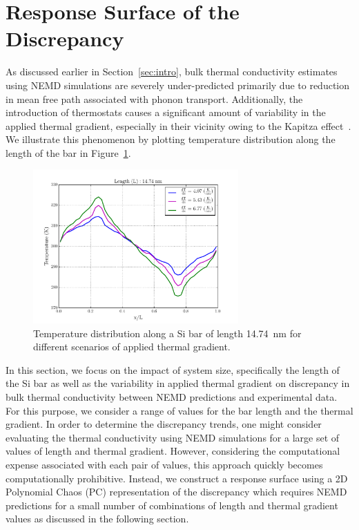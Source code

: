 \section{Response Surface of the Discrepancy}
\label{sec:response}

As discussed earlier in Section~\ref{sec:intro}, bulk thermal conductivity estimates using NEMD simulations
are severely under-predicted primarily due to reduction in mean free path associated with phonon transport. 
Additionally, the introduction of thermostats causes a significant amount of variability in the applied thermal gradient,
especially in their vicinity owing to the Kapitza effect~\cite{Stevens:2007}. 
We illustrate this phenomenon by plotting temperature 
distribution along the length of the bar in Figure~\ref{fig:kapitza}. 

\begin{figure}[htbp]
 \begin{center}
  \includegraphics[width=0.70\textwidth]{./Figures/temp_plot}
\caption{Temperature distribution along a Si bar of length 14.74~nm for
different scenarios of applied thermal gradient.}
\label{fig:kapitza}
\end{center}
\end{figure}

In this section, we focus on the impact of
system size, specifically the length of the Si bar as well as the variability in applied thermal gradient on discrepancy
in bulk thermal conductivity between NEMD predictions and experimental data. For this purpose, we consider
a range of values for the bar length and the thermal gradient. In order to determine the discrepancy trends, one
might consider evaluating the thermal conductivity using NEMD simulations for a large set of values of length and
thermal gradient. However, considering the computational expense associated with each pair of values, this approach quickly
becomes computationally prohibitive. Instead, we construct a response surface using a 2D
Polynomial Chaos (PC) representation of the discrepancy which requires NEMD predictions for a small number of
combinations of length and thermal gradient values as discussed in the following section. 

